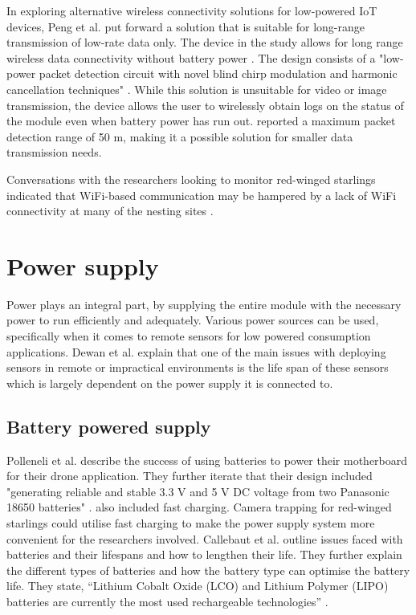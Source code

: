 \documentclass[class=report,11pt,crop=false]{standalone}
\begin{document}
In exploring alternative wireless connectivity solutions for low-powered IoT devices, Peng et al. \cite{peng2018plora} put forward a solution that is suitable for long-range transmission of low-rate data only. The device in the study allows for long range wireless data connectivity without battery power \cite{peng2018plora}. The design consists of a "low-power packet detection circuit with novel blind chirp modulation and harmonic cancellation techniques" \cite{peng2018plora}. While this solution is unsuitable for video or image transmission, the device allows the user to wirelessly obtain logs on the status of the module even when battery power has run out. \cite{peng2018plora} reported a maximum packet detection range of 50 m, making it a possible solution for smaller data transmission needs. 

Conversations with the researchers looking to monitor red-winged starlings indicated that WiFi-based communication may be hampered by a lack of WiFi connectivity at many of the nesting sites \cite{hofmeyer2024private}.

\section{Power supply}

Power plays an integral part, by supplying the entire module with the necessary power to run efficiently and adequately. Various power sources can be used, specifically when it comes to remote sensors for low powered consumption applications. Dewan et al. \cite{dewan2014alternative} explain that one of the main issues with deploying sensors in remote or impractical environments is the life span of these sensors which is largely dependent on the power supply it is connected to. 

\subsection{Battery powered supply}

Polleneli et al. \cite{polonelli2020flexible} describe the success of using batteries to power their motherboard for their drone application. They further iterate that their design included "generating reliable and stable 3.3 V and 5 V DC voltage from two Panasonic 18650 batteries" \cite{polonelli2020flexible}. \cite{polonelli2020flexible} also included fast charging. Camera trapping for red-winged starlings could utilise fast charging to make the power supply system more convenient for the researchers involved. Callebaut et al. \cite{callebaut2021art} outline issues faced with batteries and their lifespans and how to lengthen their life. They further explain the different types of batteries and how the battery type can optimise the battery life. They state, “Lithium Cobalt Oxide (LCO) and Lithium Polymer (LIPO) batteries are currently the most used rechargeable technologies” \cite{callebaut2021art}.
\end{document}
